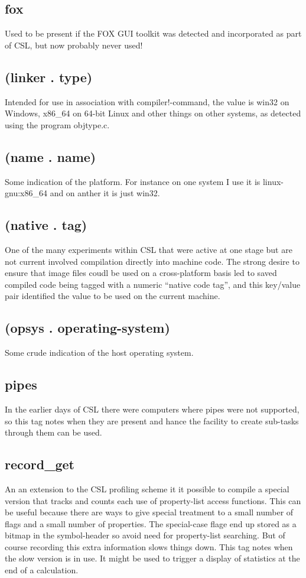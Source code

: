\documentclass[a4paper,11pt]{article}
\begin{document}
{\subsection{\ttfamily fox}
Used to be present if the FOX GUI toolkit was detected and incorporated as
part of CSL, but now probably never used!

\subsection{\ttfamily (linker . type)}
Intended for use in association with {\ttfamily compiler!-command}, the value
is {\ttfamily win32} on Windows, {\ttfamily x86\_64} on 64-bit Linux and
other things on other systems, as detected using the program {\ttfamily
objtype.c}.

\subsection{\ttfamily (name . name)}
Some indication of the platform. For instance on one system I use it
is {\ttfamily linux-gnu:x86\_64} and on anther it is just {\ttfamily win32}.

\subsection{\ttfamily (native . tag)}
One of the many experiments within CSL that were active at one stage but are
not current involved compilation directly into machine code. The strong
desire to ensure that image files coudl be used on a cross-platform basis
led to saved compiled code being tagged with a numeric ``native code tag'',
and this key/value pair identified the value to be used on the current
machine.

\subsection{\ttfamily (opsys . operating-system)}
Some crude indication of the host operating system.

\subsection{\ttfamily pipes}
In the earlier days of CSL there were computers where pipes were not
supported, so this tag notes when they are present and hance the facility
to create sub-tasks through them can be used.

\subsection{\ttfamily record\_get}
An an extension to the CSL profiling scheme it it possible to compile
a special version that tracks and counts each use of property-list access
functions. This can be useful because there are ways to give special
treatment to a small number of flags and a small number of properties. The
special-case flage end up stored as a bitmap in the symbol-header so avoid
need for property-list searching. But of course recording this extra
information slows things down. This tag notes when the slow version is
in use. It might be used to trigger a display of statistics at the end of
a calculation.

}
\end{document}
